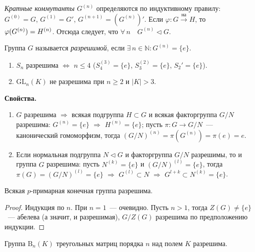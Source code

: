 \documentclass[a4paper]{article}
\newcommand{\svoy}{\vspace{5pt}\noindent\textbf{Свойства.}\vspace{-6pt}}
\newcommand*{\p}[1]{#1\nobreak\discretionary{}{\hbox{$\mathsurround=0pt #1$}}{}}
\begin{document}
\emph{Кратные коммутанты} $G^{(n)}$ определяются по индуктивному
правилу: $G^{(0)}=G$, $G^{(1)}=G'$, $G^{(n+1)}=(G^{(n)})'$. Если
$\varphi\colon G\stackrel{\text{на}}{\to} H$, то
$\varphi(G^{(n)})\p=H^{(n)}$. Отсюда следует, что $\forall \, n\quad
G^{(n)}\triangleleft G$.

Группа $G$ называется \emph{разрешимой}, если $\exists \,
n\in\mathbb{N}: G^{(n)}=\{e\}$.

\prim
\begin{enumerate}
  \item $S_n$ разрешима $\Leftrightarrow$ $n\leqslant 4$ ($S_4^{(3)}
  =\{e\}$, $S_3^{(2)}=\{e\}$, $S_2'=\{e\}$).
  \item $\mathrm{GL}_n(K)$ не разрешима при $n\geqslant 2$ и $|K|>3$.
\end{enumerate}

\svoy
\begin{enumerate}
  \item $G$ разрешима $\Rightarrow$ всякая подгруппа $H\subset G$ и
  всякая факторгруппа $G/N$ разрешима: $G^{(n)}=\{e\}$ $\Rightarrow$
  $H^{(n)}=\{e\}$; пусть $\pi\colon G\to G/N$~--- канонический
  гомоморфизм, тогда $(G/N)^{(n)}=\pi(G^{(n)})=\pi(e)=e$.
  \item Если нормальная подгруппа $N\triangleleft G$ и факторгруппа
  $G/N$ разрешимы, то и группа $G$ разрешима: пусть $N^{(k)}=\{e\}$
  и $(G/N)^{(l)}=\{e\}$, тогда $\pi(G)=(G/N)^{(l)}=\{e\}$
  $\Rightarrow$ $G^{(l)}\subset N$ $\Rightarrow$ $G^{l+k}\subset
  N^{(k)}=\{e\}$.
\end{enumerate}

\begin{theorem}
Всякая $p$-примарная конечная группа разрешима.
\end{theorem}

\begin{proof}
Индукция по $n$. При $n=1$~--- очевидно. Пусть $n>1$, тогда
$Z(G)\neq \{e\}$~--- абелева (а значит, и разрешимая), $G/Z(G)$
разрешима по предположению индукции.
\end{proof}

\begin{theorem}
Группа $\mathrm{B}_n(K)$ треугольных матриц порядка $n$ над полем
$K$ разрешима.
\end{theorem}
\end{document}
